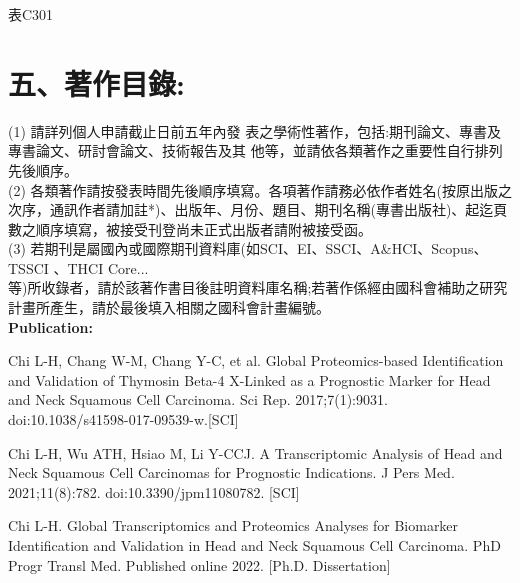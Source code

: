 \documentclass[12pt, a4paper]{article}
\newcommand{\cntext}[1]{\begin{CJK*}{UTF8}{bkai}#1\end{CJK*}}
\begin{document}
\clearpage

\begin{CJK*}{UTF8}{bkai}
表C301
\section*{五、著作目錄:}


(1) 請詳列個人申請截止日前五年內發 表之學術性著作，包括:期刊論文、專書及專書論文、研討會論文、技術報告及其 他等，並請依各類著作之重要性自行排列先後順序。\\
(2) 各類著作請按發表時間先後順序填寫。各項著作請務必依作者姓名(按原出版之 次序，通訊作者請加註*)、出版年、月份、題目、期刊名稱(專書出版社)、起迄頁數之順序填寫，被接受刊登尚未正式出版者請附被接受函。\\
(3) 若期刊是屬國內或國際期刊資料庫(如SCI、EI、SSCI、A\&HCI、Scopus、TSSCI 、THCI Core...\\等)所收錄者，請於該著作書目後註明資料庫名稱;若著作係經由國科會補助之研究計畫所產生，請於最後填入相關之國科會計畫編號。\\

\textbf{Publication:}\\
\begin{outline}
\1 Chi L-H, Chang W-M, Chang Y-C, et al. Global Proteomics-based Identification and Validation of Thymosin Beta-4 X-Linked as a Prognostic Marker for Head and Neck Squamous Cell Carcinoma. Sci Rep. 2017;7(1):9031. doi:10.1038/s41598-017-09539-w.[SCI]

\1 Chi L-H, Wu ATH, Hsiao M, Li Y-CCJ. A Transcriptomic Analysis of Head and Neck Squamous Cell Carcinomas for Prognostic Indications. J Pers Med. 2021;11(8):782. doi:10.3390/jpm11080782. [SCI]

\1 Chi L-H. Global Transcriptomics and Proteomics Analyses for Biomarker Identification and Validation in Head and Neck Squamous Cell Carcinoma. PhD Progr Transl Med. Published online 2022. [Ph.D. Dissertation]


\end{outline}
\end{CJK*}
\end{document}
